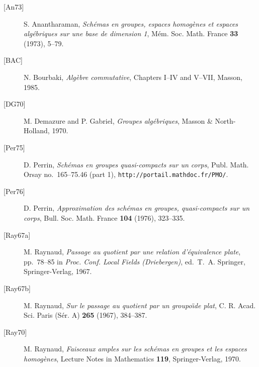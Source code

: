 \begin{description}
\item[{[An73]}] S. Anantharaman,
  \emph{Sch\'emas en groupes, espaces homog\`enes et espaces
  alg\'ebriques sur une base de dimension 1},
  M\'em. Soc. Math. France \textbf{33} (1973), 5--79.
\item[{[BAC]}] N. Bourbaki,
  \emph{Alg\`ebre commutative}, Chapters I--IV and V--VII,
  Masson, 1985.
\item[{[DG70]}] M. Demazure and P. Gabriel,
  \emph{Groupes alg\'ebriques}, Masson \& North-Holland, 1970.
\item[{[Per75]}] D. Perrin,
  \emph{Sch\'emas en groupes quasi-compacts sur un corps},
  Publ. Math. Orsay no.~165--75.46 (part 1),
  \texttt{http://portail.mathdoc.fr/PMO/}.
\item[{[Per76]}] D. Perrin,
  \emph{Approximation des sch\'emas en groupes, quasi-compacts
  sur un corps}, Bull. Soc. Math. France \textbf{104} (1976),
  323--335.
\item[{[Ray67a]}] M. Raynaud,
  \emph{Passage au quotient par une relation d'\'equivalence
  plate}, pp.~78--85 in \emph{Proc. Conf. Local Fields
  (Driebergen)}, ed.\ T.~A. Springer, Springer-Verlag, 1967.
\item[{[Ray67b]}] M. Raynaud,
  \emph{Sur le passage au quotient par un groupo\"\i de plat},
  C. R. Acad. Sci. Paris (S\'er. A) \textbf{265} (1967),
  384--387.
\item[{[Ray70]}] M. Raynaud,
  \emph{Faisceaux amples sur les sch\'emas en groupes et les
  espaces homog\`enes}, Lecture Notes in Mathematics
  \textbf{119}, Springer-Verlag, 1970.
\end{description}


